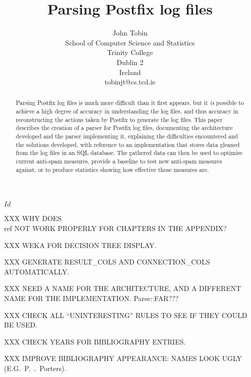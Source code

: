 \documentclass[a4paper,12pt,draft]{report}
\begin{document}
\title{Parsing Postfix log files}
\author{John Tobin \\ School of Computer Science and Statistics \\
Trinity College \\ Dublin 2 \\ Ireland \\ tobinjt@cs.tcd.ie}
\maketitle

\begin{abstract}


    Parsing Postfix log files is much more difficult than it first appears,
    but it \textit{is\/} possible to achieve a high degree of accuracy in
    understanding the log files, and thus accuracy in reconstructing the
    actions taken by Postfix to generate the log files.  This paper
    describes the creation of a parser for Postfix log files, documenting
    the architecture developed and the parser implementing it, explaining
    the difficulties encountered and the solutions developed, with
    reference to an implementation that stores data gleaned from the log
    files in an SQL database.  The gathered data can then be used to
    optimise current anti-spam measures, provide a baseline to test new
    anti-spam measures against, or to produce statistics showing how
    effective those measures are.

\end{abstract}

\SVN$Id$
\begin{center}
    \SVNId{}
\end{center}

XXX WHY DOES \\ref{} NOT WORK PROPERLY FOR CHAPTERS IN THE APPENDIX\@?

XXX WEKA FOR DECISION TREE DISPLAY\@.

XXX GENERATE RESULT\_COLS AND CONNECTION\_COLS AUTOMATICALLY\@.

XXX NEED A NAME FOR THE ARCHITECTURE, AND A DIFFERENT NAME FOR THE
IMPLEMENTATION\@.  Parse::FAR\@???

XXX CHECK ALL ``UNINTERESTING'' RULES TO SEE IF THEY COULD BE USED\@.

XXX CHECK YEARS FOR BIBLIOGRAPHY ENTRIES\@.

XXX IMPROVE BIBLIOGRAPHY APPEARANCE\@: NAMES LOOK UGLY (E.G.\ P.\
\empty{}.\ Porters)\@.
\end{document}
